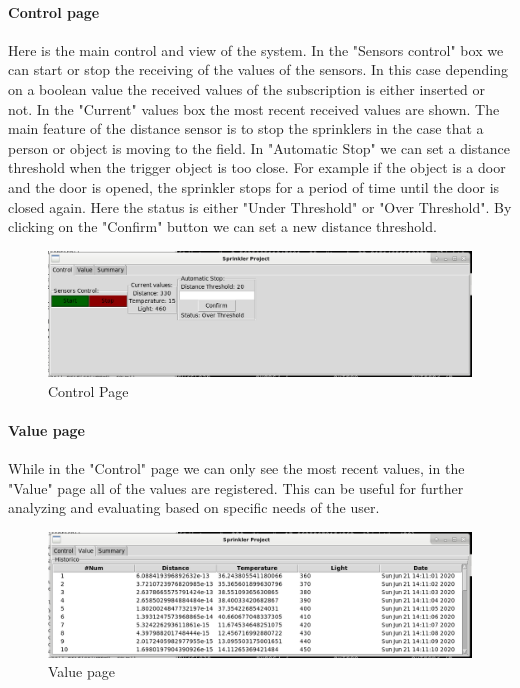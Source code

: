 \documentclass{article}
\begin{document}
\paragraph{Control page}
Here is the main control and view of the system. In the "Sensors control" box we can start or stop the receiving of the values of the sensors. In this case depending on a boolean value the received values of the subscription is either inserted or not. In the "Current" values box the most recent received values are shown. The main feature of the distance sensor is to stop the sprinklers in the case that a person or object is moving to the field. In "Automatic Stop" we can set a distance threshold when the trigger object is too close. For example if the object is a door and the door is opened, the sprinkler stops for a period of time until the door is closed again. Here the status is either "Under Threshold" or "Over Threshold". By clicking on the "Confirm" button we can set a new distance threshold.
\begin{figure}
    \centering
	\includegraphics[scale=0.3]{control_view.png}
	\caption{Control Page}
	\label{fig:control}
\end{figure}
\paragraph{Value page}
While in the "Control" page we can only see the most recent values, in the "Value" page all of the values are registered. This can be useful for further analyzing and evaluating based on specific needs of the user. 
\begin{figure}
    \centering
    \includegraphics[scale=0.3]{value_view.png}
	\caption{Value page}
	\label{fig:value}
\end{figure}
\end{document}
